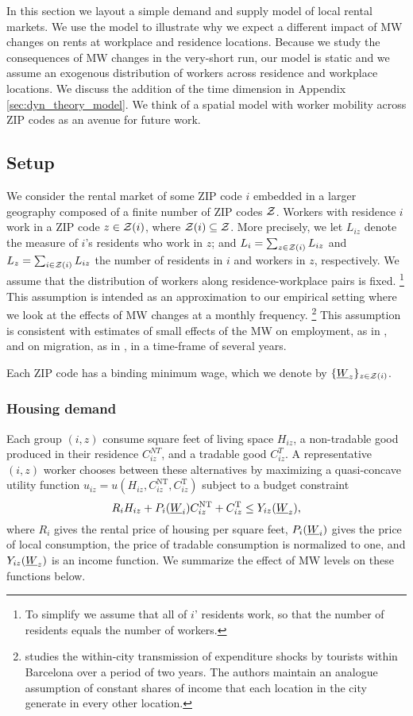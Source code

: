 
In this section we layout a simple demand and supply model of local rental markets.
We use the model to illustrate why we expect a different impact of MW changes 
on rents at workplace and residence locations.
Because we study the consequences of MW changes in the very-short run, our model is 
static and we assume an exogenous distribution of workers across residence and 
workplace locations.
We discuss the addition of the time dimension in Appendix \ref{sec:dyn_theory_model}.
We think of a spatial model with worker mobility across ZIP codes as an avenue 
for future work.

\subsection{Setup}

We consider the rental market of some ZIP code $i$ embedded in a larger geography 
composed of a finite number of ZIP codes $\mathcal{Z}$.
Workers with residence $i$ work in a ZIP code $z\in\mathcal{Z}(i)$, where 
$\mathcal{Z}(i)\subseteq\mathcal{Z}$.
More precisely, we let $L_{iz}$ denote the measure of $i$'s residents who work 
in $z$; and 
$L_i = \sum_{z \in \mathcal{Z}(i)} L_{iz}$ and $L_z = \sum_{i \in \mathcal{Z}(i)} L_{iz}$ the 
number of residents in $i$ and workers in $z$, respectively.
We assume that the distribution of workers along residence-workplace pairs is 
fixed.%
\footnote{To simplify we assume that all of $i$' residents work, so that the 
number of residents equals the number of workers.}
This assumption is intended as an approximation to our empirical setting where 
we look at the effects of MW changes at a monthly frequency.%
\footnote{\textcite{AllenEtAl2020} studies the within-city transmission of 
expenditure shocks by tourists within Barcelona over a period of two years.
The authors maintain an analogue assumption of constant shares of income that
each location in the city generate in every other location.}
This assumption is consistent with estimates of small effects of the MW on 
employment, as in \textcite{CegnizEtAl2019, DustmannEtAl2022}, and 
on migration, as in \textcite{PerezPerez2021}, 
in a time-frame of several years.

Each ZIP code has a binding minimum wage, which we denote by 
$\{\underline{W}_z\}_{z\in\mathcal{Z}(i)}$.

\subsubsection*{Housing demand}

Each group $(i,z)$ consume
square feet of living space $H_{iz}$, 
a non-tradable good produced in their residence $C_{iz}^{NT}$, and
a tradable good $C_{iz}^T$.
A representative $(i,z)$ worker chooses between these alternatives by maximizing
a quasi-concave utility function 
$u_{iz} = u \left(H_{iz}, C^{\text{NT}}_{iz}, C^{\text{T}}_{iz}\right)$
subject to a budget constraint
$$R_i H_{iz} + P_i(\underline{W}_i) C^{\text{NT}}_{iz} + C^{\text{T}}_{iz} \leq Y_{iz}(\underline{W}_z),$$
where
$R_i$ gives the rental price of housing per square feet,
$P_i(\underline{W}_i)$ gives the price of local consumption,
the price of tradable consumption is normalized to one, and 
$Y_{iz}(\underline{W}_z)$ is an income function.
We summarize the effect of MW levels on these functions below.

